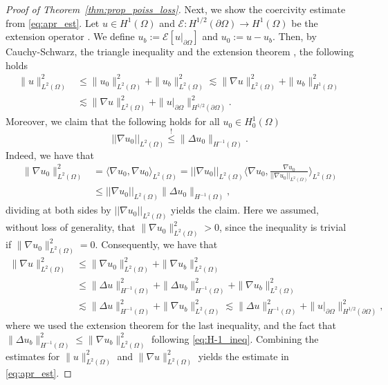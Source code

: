 \documentclass[pdflatex]{sn-jnl}%
\begin{document}
\begin{proof}[Proof of Theorem~\ref{thm:prop_poiss_loss}]
Next, we show the coercivity estimate from \eqref{eq:apr_est}. Let $u\in H^1(\Omega)$ and $\mathcal{E}:H^{1/2}(\partial\Omega)\rightarrow H^1(\Omega)$ be the extension operator \cite{Necas2010-yx}. We define $u_b:=\mathcal{E}[u|_{\partial \Omega}]$ and $u_0:=u-u_b$. Then, by Cauchy-Schwarz, the triangle inequality and the extension theorem \cite{HAJLASZ1997221}, the following holds
\begin{equation}\label{eq:est_l2-1}
\begin{aligned}
    \|u\|_{L^2(\Omega)}^2&\leq   \|u_0\|_{L^2(\Omega)}^2+\| u_b\|_{L^2(\Omega)}^2\lesssim \|\nabla u\|_{L^2(\Omega)}^2+\|u_b\|_{H^1(\Omega)}^2\\&
    \lesssim \|\nabla u\|_{L^2(\Omega)}^2+\|u|_{\partial\Omega}\|_{H^{1/2}(\partial\Omega)}^2.
\end{aligned}
\end{equation}
Moreover, we claim that the following holds for all $u_0\in H^1_0(\Omega)$
\begin{equation}
    ||\nabla u_0||_{L^2(\Omega)}\stackrel{!}{\leq} \|\Delta u_0\|_{H^{-1}(\Omega)}.
\end{equation}
Indeed, we have that
\begin{align}
\|\nabla u_0\|_{L^2(\Omega)}^2 &= \langle \nabla u_0,\nabla u_0\rangle_{L^2(\Omega)} =||\nabla u_0||_{L^2(\Omega)}\langle \nabla u_0,\frac{\nabla u_0}{||\nabla u_0||_{L^2(\Omega)}}\rangle_{L^2(\Omega)} \\&
\leq||\nabla u_0||_{L^2(\Omega)}\|\Delta u_0\|_{H^{-1}(\Omega)},
\end{align}
dividing at both sides by $||\nabla u_0||_{L^2(\Omega)}$ yields the claim. 
Here we assumed, without loss of generality, that \(\|\nabla u_0\|_{L^2(\Omega)}^2 > 0\), since the inequality is trivial if \(\|\nabla u_0\|_{L^2(\Omega)}^2 = 0\).
Consequently, we have that
\begin{equation}\label{eq:est_nab-1}
\begin{aligned}
    \|\nabla u\|_{L^2(\Omega)}^2&\leq \|\nabla u_0\|_{L^2(\Omega)}^2+\|\nabla u_b\|_{L^2(\Omega)}^2\\&\leq \|\Delta u\|_{H^{-1}(\Omega)}^2+\|\Delta u_b\|_{H^{-1}(\Omega)}^2+\|\nabla u_b\|_{L^2(\Omega)}^2\\&
    \lesssim \|\Delta u\|_{H^{-1}(\Omega)}^2+\|\nabla u_b\|_{L^2(\Omega)}^2\lesssim  \|\Delta u\|_{H^{-1}(\Omega)}^2+\|u|_{\partial\Omega}\|_{H^{1/2}(\partial\Omega)}^2,
\end{aligned}
\end{equation}
where we used the extension theorem for the last inequality, and the fact that $\|\Delta u_b\|_{H^{-1}(\Omega)}^2\leq \| \nabla u_b\|_{L^2(\Omega)}^2$ following \eqref{eq:H-1_ineq}. Combining the estimates for $\|u\|_{L^2(\Omega)}^2$ and $\|\nabla u\|_{L^2(\Omega)}^2$ yields the estimate in \eqref{eq:apr_est}.


\end{proof}
\end{document}
